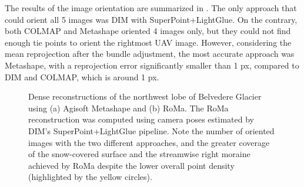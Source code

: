 The results of the image orientation are summarized in .
The only approach that could orient all 5 images was DIM with SuperPoint+LightGlue. 
On the contrary, both COLMAP and Metashape oriented 4 images only, but they could not find enough tie points to orient the rightmost UAV image.
However, considering the mean reprojection after the bundle adjustment, the most accurate approach was Metashape, with a reprojection error significantly smaller than 1 px, compared to DIM and COLMAP, which is around 1 px. 

\begin{figure}
  \centering
  \caption{Dense reconstructions of the northwest lobe of Belvedere Glacier using (a) Agisoft Metashape and (b) RoMa. The RoMa reconstruction was computed using camera poses estimated by DIM's SuperPoint+LightGlue pipeline. Note the number of oriented images with the two different approaches, and the greater coverage of the snow-covered surface and the streamwise right moraine achieved by RoMa despite the lower overall point density (highlighted by the yellow circles).}
  \label{fig:5:winter_res}
\end{figure}

